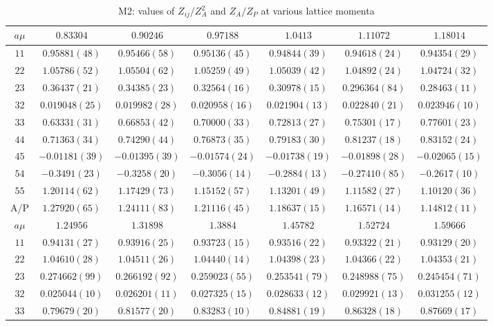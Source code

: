 \begin{table}
\begin{center}
\caption{M2: values of $Z_{ij}/Z_A^2$ and $Z_A/Z_P$ at various lattice momenta}
\begin{tabular}{c|c c c c c c}
\hline
\hline
$a\mu$ & $0.83304$ & $0.90246$ & $0.97188$ & $1.0413$ & $1.11072$ & $1.18014$ \\
\hline
$11$ & $0.95881(48)$ & $0.95466(58)$ & $0.95136(45)$ & $0.94844(39)$ & $0.94618(24)$ & $0.94354(29)$ \\
$22$ & $1.05786(52)$ & $1.05504(62)$ & $1.05259(49)$ & $1.05039(42)$ & $1.04892(24)$ & $1.04724(32)$ \\
$23$ & $0.36437(21)$ & $0.34385(23)$ & $0.32564(16)$ & $0.30978(15)$ & $0.296364(84)$ & $0.28463(11)$ \\
$32$ & $0.019048(25)$ & $0.019982(28)$ & $0.020958(16)$ & $0.021904(13)$ & $0.022840(21)$ & $0.023946(10)$ \\
$33$ & $0.63331(31)$ & $0.66853(42)$ & $0.70000(33)$ & $0.72813(27)$ & $0.75301(17)$ & $0.77601(23)$ \\
$44$ & $0.71363(34)$ & $0.74290(44)$ & $0.76873(35)$ & $0.79183(30)$ & $0.81237(18)$ & $0.83152(24)$ \\
$45$ & $-0.01181(39)$ & $-0.01395(39)$ & $-0.01574(24)$ & $-0.01738(19)$ & $-0.01898(28)$ & $-0.02065(15)$ \\
$54$ & $-0.3491(23)$ & $-0.3258(20)$ & $-0.3056(14)$ & $-0.2884(13)$ & $-0.27410(85)$ & $-0.2617(10)$ \\
$55$ & $1.20114(62)$ & $1.17429(73)$ & $1.15152(57)$ & $1.13201(49)$ & $1.11582(27)$ & $1.10120(36)$ \\
\hline
A/P & $1.27920(65)$ & $1.24111(83)$ & $1.21116(45)$ & $1.18637(15)$ & $1.16571(14)$ & $1.14812(11)$ \\
\hline
$a\mu$ & $1.24956$ & $1.31898$ & $1.3884$ & $1.45782$ & $1.52724$ & $1.59666$ \\
\hline
$11$ & $0.94131(27)$ & $0.93916(25)$ & $0.93723(15)$ & $0.93516(22)$ & $0.93322(21)$ & $0.93129(20)$ \\
$22$ & $1.04610(28)$ & $1.04511(26)$ & $1.04440(14)$ & $1.04398(23)$ & $1.04366(22)$ & $1.04353(21)$ \\
$23$ & $0.274662(99)$ & $0.266192(92)$ & $0.259023(55)$ & $0.253541(79)$ & $0.248988(75)$ & $0.245454(71)$ \\
$32$ & $0.025044(10)$ & $0.026201(11)$ & $0.027325(15)$ & $0.028633(12)$ & $0.029921(13)$ & $0.031255(12)$ \\
$33$ & $0.79679(20)$ & $0.81577(20)$ & $0.83283(10)$ & $0.84881(19)$ & $0.86328(18)$ & $0.87669(17)$ \\

\end{tabular}
\end{center}
\end{table}
